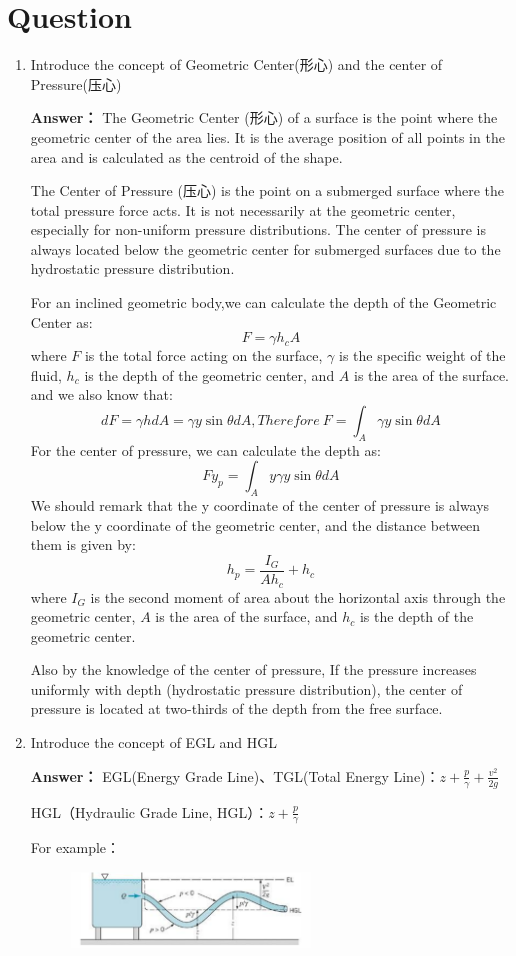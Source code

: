 \documentclass[12pt,a4paper]{article}
\newcounter{question}
\newenvironment{questions}{
    \setcounter{question}{0}
    \section*{Question}
    \begin{enumerate}[leftmargin=1.5em,label={\arabic*．}]
}{
    \end{enumerate}
}
\newcommand{\answer}[1]{\par\noindent\textbf{Answer：} #1\par\vspace{1em}}
\begin{document}
\begin{questions}
    \item Introduce the concept of Geometric Center(形心) and the center of Pressure(压心)

    \answer{
      The Geometric Center (形心) of a surface is the point where the geometric center of the area lies. It is the average position of all points in the area and is calculated as the centroid of the shape.

      The Center of Pressure (压心) is the point on a submerged surface where the total pressure force acts. It is not necessarily at the geometric center, especially for non-uniform pressure distributions. The center of pressure is always located below the geometric center for submerged surfaces due to the hydrostatic pressure distribution.

      For an inclined geometric body,we can calculate the depth of the Geometric Center as:
      \[
      F= \gamma h_c A
      \]
      where $F$ is the total force acting on the surface, $\gamma$ is the specific weight of the fluid, $h_c$ is the depth of the geometric center, and $A$ is the area of the surface.
      and we also know that:
      \[
      dF = \gamma h dA= \gamma y \sin \theta dA,Therefore \ F = \int_A \gamma y \sin \theta dA
      \]
      For the center of pressure, we can calculate the depth as:
      \[
      F y_p = \int_A y \gamma y \sin \theta dA
      \]
      We should remark that the y coordinate of the center of pressure is always below the y coordinate of the geometric center, and the distance between them is given by:
      \[
      h_p = \frac{I_G}{A h_c} + h_c
      \]
      where $I_G$ is the second moment of area about the horizontal axis through the geometric center, $A$ is the area of the surface, and $h_c$ is the depth of the geometric center.
    
      Also by the knowledge of the center of pressure, If the pressure increases uniformly with depth (hydrostatic pressure distribution), the center of pressure is located at two-thirds of the depth from the free surface.
      }
      \item Introduce the concept of EGL and HGL
  \answer{
  EGL(Energy Grade Line)、TGL(Total Energy Line)：$z+\frac{p}{\gamma}+\frac{v^2}{2g}$

HGL（Hydraulic Grade Line, HGL）：$z+\frac{p}{\gamma}$
  }

  For example：

  \begin{figure}[H]
    \centering
    \includegraphics[width=0.6\textwidth]{./figures/5.png}
  \end{figure}


\end{questions}
\end{document}
